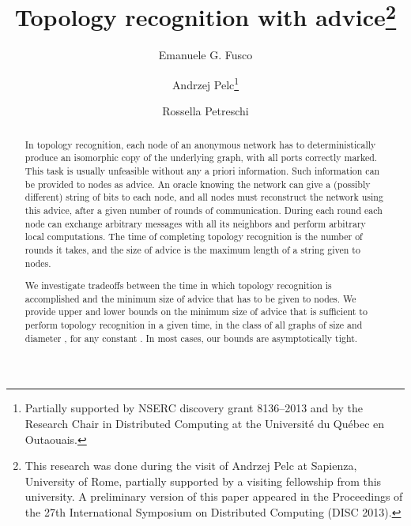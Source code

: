 \documentclass{article}
\begin{document}
\title{
Topology recognition with advice\thanks{This research was done during the visit of Andrzej Pelc at  Sapienza, University of Rome,  partially supported by a visiting fellowship from this university. A preliminary version of this paper appeared in the
Proceedings of the 27th International Symposium on Distributed Computing (DISC 2013).}
}

\author[1]{Emanuele G. Fusco}
\author[2]{Andrzej Pelc\footnote{Partially supported by NSERC discovery grant 8136--2013 
and by the Research Chair in Distributed Computing at the
Universit\'e du Qu\'ebec en Outaouais.}}
\author[3]{Rossella Petreschi}
\date{}
\maketitle

\begin{abstract}

In topology recognition,  each node of an anonymous network has to deterministically produce an isomorphic copy of
the underlying graph, with all ports correctly marked. This task is usually unfeasible without any a priori information.
Such information can be provided to nodes as advice. An oracle knowing the network can give a (possibly different)
string of bits to each node, and all nodes must reconstruct the network using this advice, after a given number of rounds
of communication. During each round each node can exchange arbitrary messages with all its neighbors and perform
arbitrary local computations. The time of completing topology recognition is the number of rounds it takes, and the size
of advice is the maximum length of a string given to nodes.

We investigate tradeoffs between the time in which topology recognition is accomplished and the minimum
size of advice that has to be given  to nodes. We provide upper and lower bounds on the minimum size of advice
that is sufficient to perform topology recognition in a given time, in the class of all graphs of size  and diameter
, for any constant . In most cases, our bounds are asymptotically tight.\end{abstract} 
\end{document}

